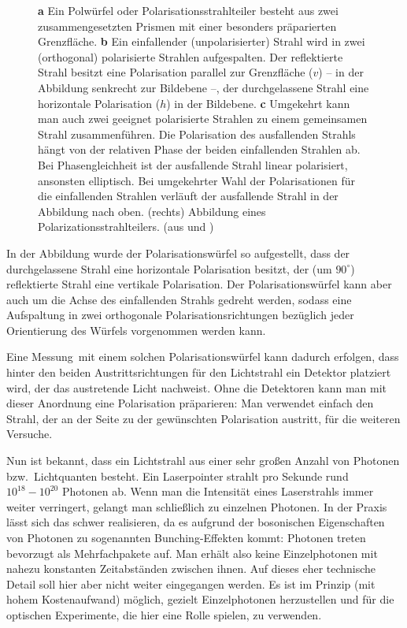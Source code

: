 \begin{figure}[htb]
\begin{picture}
\end{picture}
\caption{\label{fig_Pol}%
\textbf{a} Ein Polw\"urfel oder Polarisationsstrahlteiler
besteht aus zwei zusammengesetzten Prismen
mit einer besonders pr\"aparierten 
Grenzfl\"ache. \textbf{b} Ein einfallender
(unpolarisierter) Strahl wird in zwei (orthogonal)
polarisierte Strahlen aufgespalten. Der reflektierte
Strahl besitzt eine Polarisation parallel zur 
Grenzfl\"ache ($v$) -- in der Abbildung senkrecht
zur Bildebene --, der durchgelassene Strahl
eine horizontale Polarisation ($h$) in der Bildebene. 
\textbf{c} Umgekehrt kann
man auch zwei geeignet polarisierte Strahlen zu einem
gemeinsamen Strahl zusammenf\"uhren. Die Polarisation
des ausfallenden Strahls h\"angt von der relativen Phase
der beiden einfallenden Strahlen ab. Bei Phasengleichheit
ist der ausfallende Strahl linear polarisiert, an\-sons\-ten
elliptisch. Bei umgekehrter Wahl der Polarisationen f\"ur die
einfallenden Strahlen verl\"auft der ausfallende Strahl
in der Abbildung nach oben. (rechts) Abbildung eines Polarizationsstrahlteilers. (aus \cite{Filk} und \cite{?})}
\end{figure}

In der Abbildung wurde der Polarisationsw\"urfel so aufgestellt, dass der durchgelassene
Strahl eine horizontale Polarisation besitzt, der (um $90^\circ$) reflektierte Strahl eine
vertikale Polarisation. Der Polarisationsw\"urfel kann aber auch um die Achse des einfallenden
Strahls gedreht werden, sodass eine Aufspaltung in zwei orthogonale Polarisationsrichtungen
bez\"uglich jeder Orientierung des W\"urfels vorgenommen werden kann. 

Eine \glqq Messung\grqq\ mit einem solchen Polarisationsw\"urfel kann dadurch erfolgen,
dass hinter den beiden Austrittsrichtungen f\"ur den Lichtstrahl ein Detektor platziert wird,
der das austretende Licht nachweist. Ohne die Detektoren kann man mit dieser Anordnung
eine Polarisation pr\"aparieren: Man verwendet einfach den Strahl, der an der Seite zu
der gew\"unschten Polarisation austritt, f\"ur die weiteren Versuche. 

Nun ist bekannt, dass ein Lichtstrahl aus einer sehr gro\ss en Anzahl von Photonen bzw.\
Lichtquanten besteht. Ein Laserpointer strahlt pro Sekunde rund $10^{18}-10^{20}$ Photonen ab.
Wenn man die Intensit\"at eines Laserstrahls immer weiter verringert, gelangt man schlie\ss lich
zu einzelnen Photonen. In der Praxis l\"asst sich das schwer realisieren, da es aufgrund der
bosonischen Eigenschaften von Photonen zu sogenannten Bunching-Effekten kommt: Photonen
treten bevorzugt als Mehrfachpakete auf. Man erh\"alt also keine Einzelphotonen mit
nahezu konstanten Zeitabst\"anden zwischen ihnen. Auf dieses eher technische Detail soll hier aber
nicht weiter eingegangen werden. Es ist im Prinzip (mit hohem Kostenaufwand) m\"oglich,
gezielt Einzelphotonen herzustellen und f\"ur die optischen Experimente, die hier eine Rolle spielen,
zu verwenden. 

